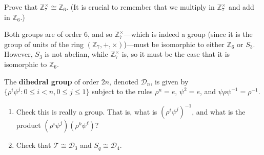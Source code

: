   \begin{exercise}[Shifrin 6.2.2]
    Prove that $\mathbb{Z}_7^{\times} \cong \mathbb{Z}_6$. (It is crucial to remember that we multiply in $\mathbb{Z}_7^{\times}$ and add in $\mathbb{Z}_6$.)
  \end{exercise}
  \begin{solution}
    Both groups are of order 6, and so $\mathbb{Z}_7^\times$---which is indeed a group (since it is the group of units of the ring $(\mathbb{Z}_7, +, \times)$)---must be isomorphic to either $\mathbb{Z}_6$ or $S_3$. However, $S_3$ is not abelian, while $\mathbb{Z}^\times_7$ is, so it must be the case that it is isomorphic to $\mathbb{Z}_6$. 
  \end{solution}

  \begin{exercise}[Shifrin 6.2.15.a/b]
    The \textbf{dihedral group} of order $2n$, denoted $\mathcal{D}_n$, is given by $\{\rho^i\psi^j : 0 \leq i < n, 0 \leq j \leq 1\}$ subject to the rules $\rho^n = e$, $\psi^2 = e$, and $\psi\rho\psi^{-1} = \rho^{-1}$.
    \begin{enumerate}
      \item Check this is really a group. That is, what is $(\rho^i\psi^j)^{-1}$, and what is the product $(\rho^i\psi^j)(\rho^k\psi^\ell)$?
      \item Check that $\mathcal{T} \cong \mathcal{D}_3$ and $S_q \cong \mathcal{D}_4$.
    \end{enumerate}
  \end{exercise}
